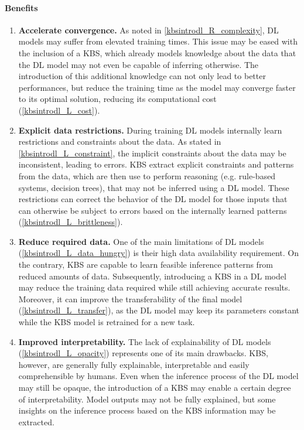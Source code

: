 \paragraph{Benefits}
\begin{enumerate} [start=1,label={\bfseries B\arabic*.}]
    \item \label{kbsintrodl_B_convergence} \textbf{Accelerate convergence.} As noted in \ref{kbsintrodl_R_complexity}, DL models may suffer from elevated training times. This issue may be eased with the inclusion of a KBS, which already models knowledge about the data that the DL model may not even be capable of inferring otherwise. The introduction of this additional knowledge can not only lead to better performances, but reduce the training time as the model may converge faster to its optimal solution, reducing its computational cost (\ref{kbsintrodl_L_cost}).
    
    \item \label{kbsintrodl_B_restrictions} \textbf{Explicit data restrictions.} During training DL models internally learn restrictions and constraints about the data. As stated in \ref{kbsintrodl_L_constraint}, the implicit constraints about the data may be inconsistent, leading to errors. KBS extract explicit constraints and patterns from the data, which are then use to perform reasoning (e.g. rule-based systems, decision trees), that may not be inferred using a DL model. These restrictions can correct the behavior of the DL model for those inputs that can otherwise be subject to errors based on the internally learned patterns (\ref{kbsintrodl_L_brittleness}). 
    
    \item \label{kbsintrodl_B_reduce} \textbf{Reduce required data.} One of the main limitations of DL models (\ref{kbsintrodl_L_data_hungry}) is their high data availability requirement. On the contrary, KBS are capable to learn feasible inference patterns from reduced amounts of data. Subsequently, introducing a KBS in a DL model may reduce the training data required while still achieving accurate results. Moreover, it can improve the transferability of the final model (\ref{kbsintrodl_L_transfer}), as the DL model may keep its parameters constant while the KBS model is retrained for a new task. 
    
    \item \label{kbsintrodl_B_interpretability} \textbf{Improved interpretability.} The lack of explainability of DL models (\ref{kbsintrodl_L_opacity}) represents one of its main drawbacks. KBS, however, are generally fully explainable, interpretable and easily comprehensible by humans. Even when the inference process of the DL model may still be opaque, the introduction of a KBS may enable a certain degree of interpretability. Model outputs may not be fully explained, but some insights on the inference process based on the KBS information may be extracted.
    
\end{enumerate}

